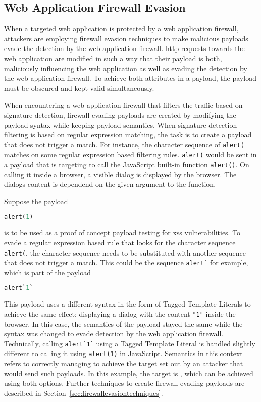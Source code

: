 \subsection{Web Application Firewall Evasion}
When a targeted web application is protected by a web application firewall, attackers are employing firewall evasion techniques to make malicious payloads evade the detection by the web application firewall.
\acrshort{http} requests towards the web application are modified in such a way that their payload is both, maliciously influencing the web application as well as evading the detection by the web application firewall. To achieve both attributes in a payload, the payload must be obscured and kept valid simultaneously. 

When encountering a web application firewall that filters the traffic based on signature detection, firewall evading payloads are created by modifying the payload syntax while keeping payload semantics.
When signature detection filtering is based on regular expression matching, the task is to create a payload that does not trigger a match.
For instance, the character sequence of \verb|alert(| matches on some regular expression based filtering rules. \verb|alert(| would be sent in a payload that is targeting to call the JavaScript built-in function \verb|alert()|. On calling it inside a browser, a visible dialog is displayed by the browser. The dialogs content is dependend on the given argument to the function. \cite{js/alert}

Suppose the payload 

\begin{lstlisting}[style=basicStyle, language=Python]
alert(1)
\end{lstlisting}

is to be used as a proof of concept payload testing for \acrshort{xss} vulnerabilities.
To evade a regular expression based rule that looks for the character sequence \verb|alert(|, the character sequence needs to be substituted with another sequence that does not trigger a match. 
This could be the sequence \verb|alert`| for example, which is part of the payload 

\begin{lstlisting}[style=basicStyle, language=Python]
alert`1`
\end{lstlisting}

This payload uses a different syntax in the form of Tagged Template Literals to achieve the same effect: displaying a dialog with the content \verb|"1"| inside the browser.
In this case, the semantics of the payload stayed the same while the syntax was changed to evade detection by the web application firewall. 
Technically, calling \verb|alert`1`| using a Tagged Template Literal is handled slightly different to calling it using \verb|alert(1)| in JavaScript. Semantics in this context refers to correctly managing to achieve the target set out by an attacker that would send such payloads. In this example, the target is , which can be achieved using both options.
Further techniques to create firewall evading payloads are described in Section~\ref{sec:firewallevasiontechniques}.

